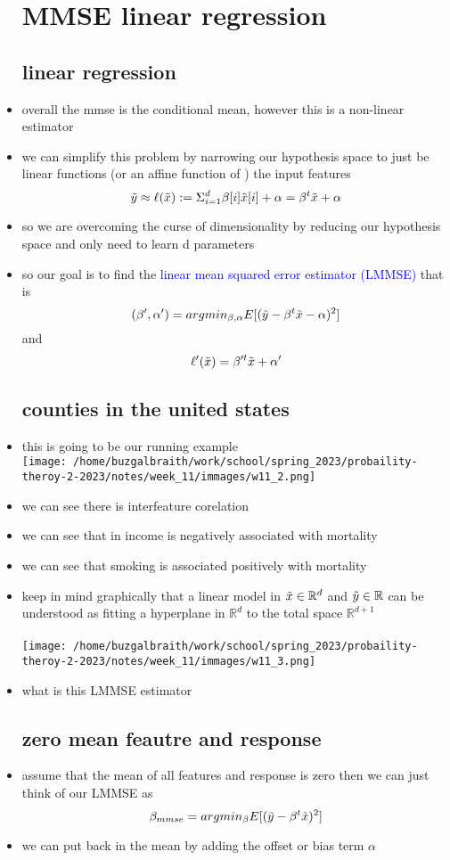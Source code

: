 \documentclass{article}
\begin{document}
\begin{itemize}
\section{MMSE linear regression}
\subsection*{linear regression}
\item overall the mmse is the conditional mean, however this is a non-linear estimator
\item we can simplify this problem by narrowing our hypothesis space to just be linear functions (or an affine function of )
the input features $$\Tilde{y}\approx \ell (\Tilde{x}):=\Sigma_{i=1}^{d} \beta[i]\Tilde{x}[i]+\alpha=\beta^t\Tilde{x}+\alpha$$
\item so we are overcoming the curse of dimensionality by reducing our hypothesis space and only need to learn d parameters
\item so our goal is to find the \textcolor{blue}{linear mean squared error estimator (LMMSE)} that is 
$$(\beta' , \alpha')=argmin_{\beta , \alpha}E[(\Tilde{y}-\beta^t \Tilde{x}-\alpha)^2]$$ and $$\ell'(\Tilde{x})=\beta'^t\Tilde{x}+\alpha'$$ 
\subsection*{counties in the united states }
\item this is going to be our running example \\\texttt{[image: /home/buzgalbraith/work/school/spring\_2023/probaility-theroy-2-2023/notes/week\_11/immages/w11\_2.png]}
\item we can see there is interfeature corelation 
\item we can see that in income is negatively associated with mortality 
\item we can see that smoking is associated positively with mortality
\item keep in mind graphically that a linear model in $\Tilde{x}\in \mathbb{R}^{d}$ and $\Tilde{y}\in \mathbb{R}$ 
can be understood as fitting a hyperplane in $\mathbb{R}^d$ to the total space $\mathbb{R}^{d+1}$ \\ \\\texttt{[image: /home/buzgalbraith/work/school/spring\_2023/probaility-theroy-2-2023/notes/week\_11/immages/w11\_3.png]}
\item what is this LMMSE estimator
\subsection*{zero mean feautre and response}
\item assume that the mean of all features and response is zero then we can just think of our LMMSE as 
$$\beta_{mmse}=argmin_{\beta}E[(\Tilde{y}-\beta^t\Tilde{x})^2]$$
\item we can put back in the mean by adding the offset or bias term $\alpha$

\end{itemize}
\end{document}
